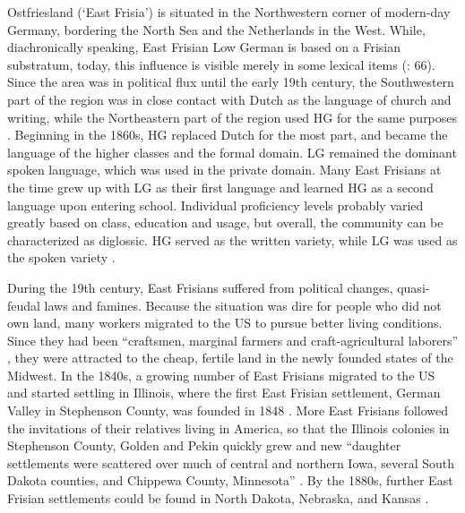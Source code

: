 \documentclass[output=paper]{langsci/langscibook}
\begin{document}
Ostfriesland (‘East Frisia’) is situated in the Northwestern corner of modern-day Germany, bordering the North Sea and the Netherlands in the West. While, diachronically speaking, East Frisian Low German is based on a Frisian substratum, today, this influence is visible merely in some lexical items (\citealt{vanBree2017}: 66). Since the area was in political flux until the early 19th century, the Southwestern part of the region was in close contact with Dutch as the language of church and writing, while the Northeastern part of the region used HG for the same purposes \citep[27]{Reershemius2004}. Beginning in the 1860s, HG replaced Dutch for the most part, and became the language of the higher classes and the formal domain. LG remained the dominant spoken language, which was used in the private domain. Many East Frisians at the time grew up with LG as their first language and learned HG as a second language upon entering school. Individual proficiency levels probably varied greatly based on class, education and usage, but overall, the community can be characterized as diglossic. HG served as the written variety, while LG was used as the spoken variety \citep{Reershemius2004}.

During the 19th century, East Frisians suffered from political changes, quasi-feudal laws and famines. Because the situation was dire for people who did not own land, many workers migrated to the US to pursue better living conditions. Since they had been “craftsmen, marginal farmers and craft-agricultural laborers” \citep[163]{Frizzel1992}, they were attracted to the cheap, fertile land in the newly founded states of the Midwest. In the 1840s, a growing number of East Frisians migrated to the US and started settling in Illinois, where the first East Frisian settlement, German Valley in Stephenson County, was founded in 1848 \citep{Schnucker1917}. More East Frisians followed the invitations of their relatives living in America, so that the Illinois colonies in Stephenson County, Golden and Pekin quickly grew and new “daughter settlements were scattered over much of central and northern Iowa, several South Dakota counties, and Chippewa County, Minnesota” \citep[163]{Frizzel1992}. By the 1880s, further East Frisian settlements could be found in North Dakota, Nebraska, and Kansas \citep[79]{Lindaman2004}. 
\end{document}
